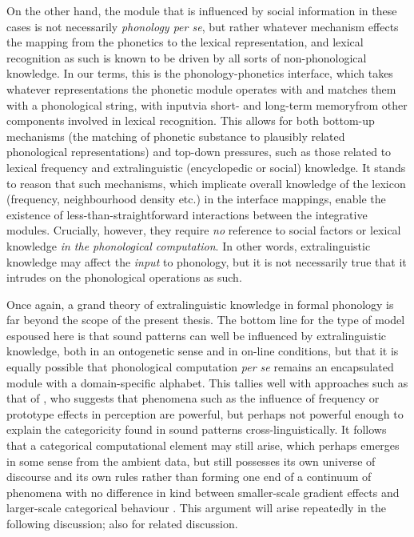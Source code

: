 On the other hand, the module that is influenced by social information in these cases is not necessarily \emph{phonology per se}, but rather whatever mechanism effects the mapping from the phonetics to the lexical representation, and lexical recognition as such is known to be driven by all sorts of non\hyp phonological knowledge. In our terms, this is the phonology\hyp phonetics interface, which takes whatever representations the phonetic module operates with and matches them with a phonological string, with input\dash via short- and long\hyp term memory\dash from other components involved in lexical recognition. This allows for both bottom\hyp up mechanisms (\eg the matching of phonetic substance to plausibly related phonological representations) and top\hyp down pressures, such as those related to lexical frequency and extralinguistic (\eg encyclopedic or social) knowledge. It stands to reason that such mechanisms, which implicate overall knowledge of the lexicon (\eg frequency, neighbourhood density etc.) in the interface mappings, enable the existence of less\hyp than\hyp straightforward interactions between the integrative modules. Crucially, however, they require \emph{no} reference to social factors or lexical knowledge \emph{in the phonological computation}. In other words, extralinguistic knowledge may affect the \emph{input} to phonology, but it is not necessarily true that it intrudes on the phonological operations as such.

Once again, a grand theory of extralinguistic knowledge in formal phonology is far beyond the scope of the present thesis. The bottom line for the type of model espoused here is that sound patterns can well be influenced by extralinguistic knowledge, both in an ontogenetic sense and in on\hyp line conditions, but that it is equally possible that phonological computation \emph{per se} remains an encapsulated module with a domain\hyp specific alphabet. This tallies well with approaches such as that of \citet{cohn06:_is,cohn11:_featur}, who suggests that phenomena such as the influence of frequency or prototype effects in perception are powerful, but perhaps not powerful enough to explain the categoricity found in sound patterns cross\hyp linguistically. It follows that a categorical computational element may still arise, which perhaps emerges in some sense from the ambient data, but still possesses its own universe of discourse and its own rules rather than forming one end of a continuum of phenomena with no difference in kind between smaller\hyp scale gradient effects and larger\hyp scale categorical behaviour \citep[à~la][]{wedel}. This argument will arise repeatedly in the following discussion; \cf also \citet{barnesbook,moreton06:_analy,bermudez-diachr,becker11:_surfeit_stimul,beckerng:_asymm_gener_alter_initial_syllab} for related discussion.

